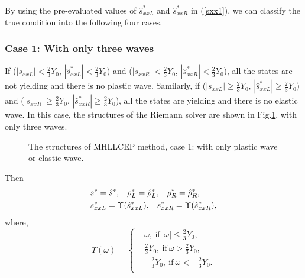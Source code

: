 \documentclass[review]{elsarticle}
\begin{document}
By using the pre-evaluated values of $\hat{s}_{xxL}^*$ and $\hat{s}_{xxR}^*$ in (\ref{sxx1}), we can classify the true condition into the following four cases.


\subsubsection{Case 1: With only three waves}\label{sec:case1}
%
If ($|s_{xxL}|<\frac{2}{3}Y_0$, $|\hat{s}_{xxL}^*| < \frac{2}{3}Y_0$)  and  ($|s_{xxR}|<\frac{2}{3}Y_0$, $|\hat{s}_{xxR}^*| < \frac{2}{3}Y_0$), all the states are not yielding and there is no plastic wave. Samilarly, if ($|s_{xxL}|  \ge \frac{2}{3}Y_0$, $|\hat{s}_{xxL}^*| \ge  \frac{2}{3}Y_0$)  and  ($|s_{xxR}| \ge \frac{2}{3}Y_0$, $|\hat{s}_{xxR}^*| \ge  \frac{2}{3}Y_0$), all the states are yielding and there is no elastic wave.
In this case, the structures  of the Riemann solver are shown in Fig.\ref{fig:case1}, with only three waves.

\begin{figure}[htp]
  \centering
\caption{The  structures of MHLLCEP method, case 1: with only plastic wave or elastic wave.}
\label{fig:case1}
 \end{figure}

Then
\begin{align}
&  s^* = \hat{s}^*,\hspace{0.3cm} \rho^*_L = \hat{\rho}_L^*, \hspace{0.3cm} \rho_R^* = \hat{\rho}_R^*,\\
&  s_{xxL}^*  = \Upsilon(\hat{s}_{xxL}^*),\hspace{0.3cm} s_{xxR}^*  = \Upsilon(\hat{s}_{xxR}^*),
\end{align}
where,
\begin{equation}\label{eq:upsilon}
  \Upsilon(\omega) = \left\{ \begin{aligned}
      &\omega, \  \text{if} \  |\omega| \le \frac{2}{3}Y_0,\\
      &\frac{2}{3}Y_0,  \ \text{if} \  \omega > \frac{2}{3}Y_0,\\
     &-\frac{2}{3}Y_0,  \  \text{if} \ \omega < -\frac{2}{3}Y_0.\\
 \end{aligned}\right.
 \end{equation}
\end{document}
